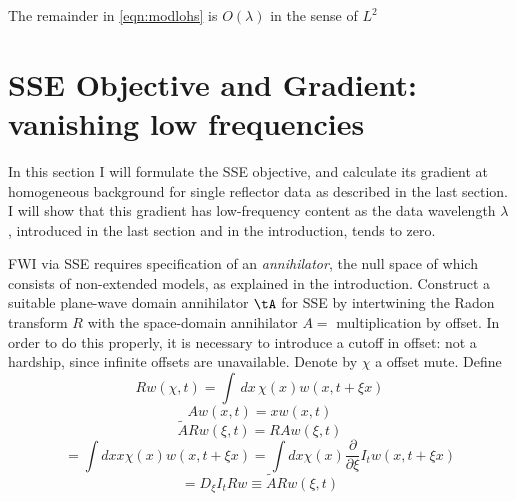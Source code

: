 The remainder in \ref{eqn:modlohs} is $O(\lambda)$ in the sense of
$L^2$





\section{SSE Objective and Gradient: vanishing low frequencies}
In this section I will formulate the SSE objective, and calculate its
gradient at homogeneous background for single reflector data as
described in the last section. I will show that this gradient has
low-frequency content as the data wavelength $\lambda$, introduced in
the last section and in the introduction, tends to zero. 

FWI via SSE requires specification of an {\em annihilator}, the null
space of which consists of non-extended models, as explained in the
introduction.  Construct a suitable plane-wave domain annihilator
$\tA$ for
SSE by intertwining the Radon transform $R$ with the space-domain
annihilator $A = $ multiplication by offset. In order to do this
properly, it is necessary to introduce a cutoff in offset: not a
hardship, since infinite offsets are unavailable. Denote by $\chi$ a
offset mute. Define
\[
Rw(\chi,t) = \int \,dx\,\chi(x) w(x,t+\xi x)
\]
\[
Aw(x,t)=x w(x,t)
\]
\[
\tilde{A} Rw (\xi,t) = R Aw (\xi,t)
\]
\[
=\int dx x \chi(x) w(x,t+\xi x) = \int dx \chi(x)\frac{\partial}{\partial \xi}
I_tw(x,t+\xi x)
\]
\[
= D_{\xi} I_t R  w \equiv \tilde{A} Rw (\xi,t) 
\]

